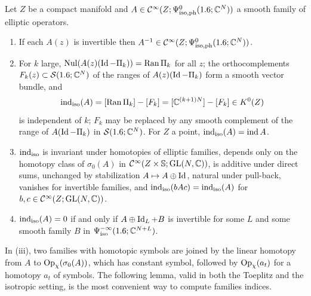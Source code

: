 \begin{proposition}\label{bott:prop:iso-families}
  Let $Z$ be a compact manifold and $A\in\mathcal{C}^\infty(Z;\Psi^{0}_{\mathrm{iso,ph}}(1.6;\mathbb{C}^N))$ a smooth family
  of elliptic operators.
  \begin{enumerate}[label=(\roman*)]
  \item If each $A(z)$ is invertible then $A^{-1}\in\mathcal{C}^\infty(Z;\Psi^{0}_{\mathrm{iso,ph}}(1.6;\mathbb{C}^N))$.
  \item For $k$ large, $\operatorname{Nul}(A(z)(\operatorname{Id}-\Pi_k))=\operatorname{Ran}\Pi_k$ for all $z$; the orthocomplements
    $F_k(z)\subset\mathcal{S}(1.6;\mathbb{C}^N)$ of the ranges of $A(z)(\operatorname{Id}-\Pi_k)$ form a smooth vector
    bundle, and
    \begin{equation*}
      \operatorname{ind}_{\mathrm{iso}}(A)=[\operatorname{Ran}\Pi_k]-[F_k]=[\mathbb{C}^{(k+1)N}]-[F_k]\in K^0(Z)
    \end{equation*}
    is independent of $k$; $F_k$ may be replaced by any smooth complement of the range of
    $A(\operatorname{Id}-\Pi_k)$ in $\mathcal{S}(1.6;\mathbb{C}^N)$. For $Z$ a point, $\operatorname{ind}_{\mathrm{iso}}(A)=\operatorname{ind} A$.
  \item $\operatorname{ind}_{\mathrm{iso}}$ is invariant under homotopies of elliptic families, depends only on
    the homotopy class of $\sigma_0(A)$ in $\mathcal{C}^\infty(Z\times\mathbb{S};\operatorname{GL}(N,\mathbb{C}))$, is additive
    under direct sums, unchanged by stabilization $A\mapsto A\oplus\operatorname{Id}$, natural under
    pull-back, vanishes for invertible families, and $\operatorname{ind}_{\mathrm{iso}}(bAc)=\operatorname{ind}_{\mathrm{iso}}(A)$ for
    $b,c\in\mathcal{C}^\infty(Z;\operatorname{GL}(N,\mathbb{C}))$.
  \item $\operatorname{ind}_{\mathrm{iso}}(A)=0$ if and only if $A\oplus\operatorname{Id}_L+B$ is invertible for some $L$ and some
    smooth family $B$ in $\Psi^{-\infty}_{\mathrm{iso}}(1.6;\mathbb{C}^{N+L})$.
  \end{enumerate}
\end{proposition}

In (iii), two families with homotopic symbols are joined by the linear homotopy from
$A$ to $\operatorname{Op}_\chi(\sigma_0(A))$, which has constant symbol, followed by
$\operatorname{Op}_\chi(a_t)$ for a homotopy $a_t$ of symbols. The following lemma, valid in both the
Toeplitz and the isotropic setting, is the most convenient way to compute families
indices.

